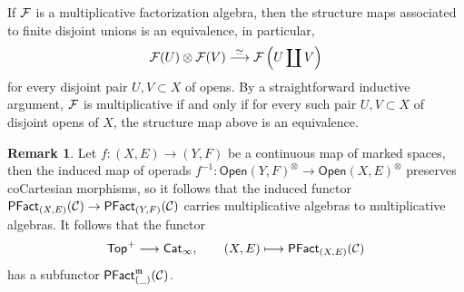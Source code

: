 \documentclass[10pt, reqno, twoside
, final
]{amsart}
\numberwithin{equation}{subsection}%
\theoremstyle{definition}
\theoremstyle{definition}
\theoremstyle{definition}
\theoremstyle{definition}
\theoremstyle{definition}
\theoremstyle{definition}
\theoremstyle{definition}
\theoremstyle{definition}
\theoremstyle{definition}
\theoremstyle{plain}
\theoremstyle{definition}
\theoremstyle{plain}
\theoremstyle{definition}
\theoremstyle{plain}
\theoremstyle{definition}
\newtheorem{rmk}[defn]{Remark}
\theoremstyle{definition}
\theoremstyle{plain}
\theoremstyle{plain}
\theoremstyle{definition}
\theoremstyle{plain}
\theoremstyle{plain}
\theoremstyle{plain}
\begin{document}
If $\mathcal{F}$ is a multiplicative factorization algebra, then the structure maps associated to finite disjoint unions is an equivalence, in particular,
\[\mathcal{F}(U)\otimes \mathcal{F}(V) \overset{\simeq}\longrightarrow \mathcal{F}\left(U\coprod V\right)\]
for every disjoint pair $U,V\subset X$ of opens. By a straightforward inductive argument, $\mathcal{F}$ is multiplicative if and only if for every such pair $U,V\subset X$ of disjoint opens of $X$, the structure map above is an equivalence. 
\begin{rmk}\label{rmk:pushfwdmultiplicative}
Let $f:(X,E)\rightarrow (Y,F)$ be a continuous map of marked spaces, then the induced map of operads $f^{-1}:\mathsf{Open}(Y,F)^{\otimes}\rightarrow \mathsf{Open}(X,E)^{\otimes}$ preserves coCartesian morphisms, so it follows that the induced functor $\mathsf{PFact}_{(X,E)}(\mathcal{C})\rightarrow \mathsf{PFact}_{(Y,F)}(\mathcal{C})$ carries multiplicative algebras to multiplicative algebras. It follows that the functor 
\[ \mathsf{Top}^+\longrightarrow \mathsf{Cat}_{\infty},\quad\quad (X,E)\longmapsto \mathsf{PFact}_{(X,E)}(\mathcal{C})  \]
has a subfunctor $\mathsf{PFact}^{\mathfrak{m}}_{(\_)}(\mathcal{C})$.
\end{rmk}
\end{document}
